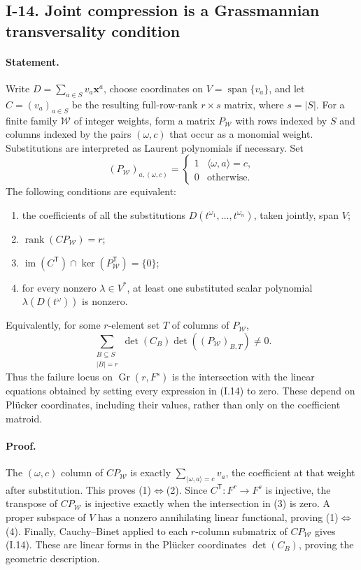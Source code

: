 \documentclass[11pt,a4paper]{article}
\theoremstyle{definition}\newtheorem{definition}{Definition}
\begin{document}
\subsection{I-14. Joint compression is a Grassmannian transversality condition}
\label{I-14}

\paragraph{Statement.}
Write $D=\sum_{a\in S}v_a\mathbf x^a$, choose coordinates on
$V=\operatorname{span}\{v_a\}$, and let $C=(v_a)_{a\in S}$ be the
resulting full-row-rank $r\times s$ matrix, where $s=|S|$.
For a finite family $\mathcal W$ of integer weights, form a matrix
$P_{\mathcal W}$ with rows indexed by $S$ and columns indexed by
the pairs $(\omega,c)$ that occur as a monomial weight.  Substitutions
are interpreted as Laurent polynomials if necessary.  Set
\[
 (P_{\mathcal W})_{a,(\omega,c)}
   =\begin{cases}1&\langle\omega,a\rangle=c,\\0&\text{otherwise.}\end{cases}
\]
The following conditions are equivalent:
\begin{enumerate}
\item the coefficients of all the substitutions
$D(t^{\omega_1},\ldots,t^{\omega_n})$, taken jointly, span $V$;
\item $\operatorname{rank}(CP_{\mathcal W})=r$;
\item $\operatorname{im}(C^{\mathsf T})\cap
\ker(P_{\mathcal W}^{\mathsf T})=\{0\}$;
\item for every nonzero $\lambda\in V^*$, at least one substituted
scalar polynomial $\lambda(D(t^\omega))$ is nonzero.
\end{enumerate}
Equivalently, for some $r$-element set $T$ of columns of $P_{\mathcal W}$,
\[
 \sum_{\substack{B\subseteq S\\|B|=r}}
   \det(C_B)\det((P_{\mathcal W})_{B,T})\ne0.
\tag{I.14}\label{eq:I-joint-Plucker}
\]
Thus the failure locus on $\operatorname{Gr}(r,F^s)$ is the
intersection with the linear equations obtained by setting every
expression in (I.14) to zero.  These depend on Pl\"ucker coordinates,
including their values, rather than only on the coefficient matroid.

\paragraph{Proof.}
The $(\omega,c)$ column of $CP_{\mathcal W}$ is exactly
$\sum_{\langle\omega,a\rangle=c}v_a$, the coefficient at that
weight after substitution.  This proves (1)$\Leftrightarrow$(2).
Since $C^{\mathsf T}:F^r\to F^s$ is injective, the transpose of
$CP_{\mathcal W}$ is injective exactly when the intersection in
(3) is zero.  A proper subspace of $V$ has a nonzero annihilating
linear functional, proving (1)$\Leftrightarrow$(4).  Finally,
Cauchy--Binet applied to each $r$-column submatrix of
$CP_{\mathcal W}$ gives (I.14).  These are linear forms in the
Pl\"ucker coordinates $\det(C_B)$, proving the geometric description.
\end{document}
